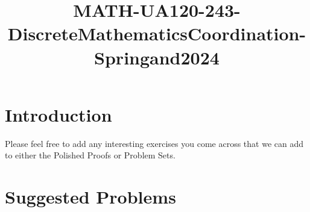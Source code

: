 \documentclass{article}
\title{MATH-UA120-243-DiscreteMathematicsCoordination-Springand2024}
\begin{document}
\maketitle

\section{Introduction}
Please feel free to add any interesting exercises you come across that we can add to either the Polished Proofs or Problem Sets.

\section{Suggested Problems}
\end{document}
